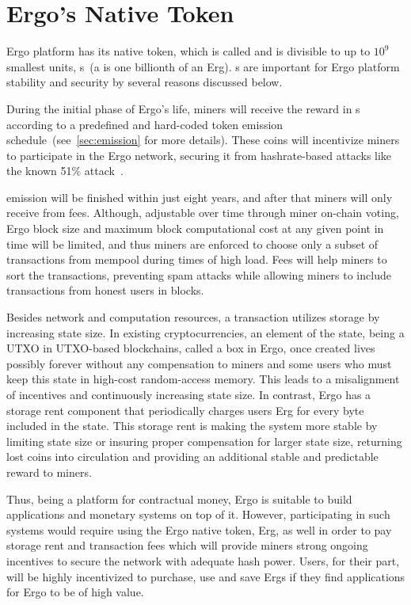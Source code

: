 \section{Ergo's Native Token}
\label{sec:currency}

Ergo platform has its native token, which is
called \Erg{} and is divisible to up to $10^9$ smallest units, \nanoErg{}s~(a \nanoErg{} is one billionth of an Erg).
\Erg{}s are important for Ergo platform stability and security by several reasons discussed below.

During the initial phase of Ergo's life, miners will receive the reward in \Erg{}s
according to a predefined and hard-coded token emission schedule~(see~\ref{sec:emission} for more details).
These coins will incentivize miners to participate in the Ergo network, securing it from hashrate-based attacks
like the known 51\% attack~\cite{reorgAttack}.

\Erg{} emission will be finished within just eight years, and after that miners will only receive \Erg{} from
fees.
Although, adjustable over time through miner on-chain voting, Ergo block size and maximum block computational
cost at any given point in time will be limited,
and thus miners are enforced to
choose only a subset of transactions from mempool during times of high load.
Fees will help miners to sort the transactions, preventing spam attacks while allowing miners
to include transactions from honest users in blocks.

Besides network and computation resources, a transaction utilizes storage by increasing state size.
In existing cryptocurrencies, an element of the state, being  a UTXO  in  UTXO-based  blockchains,  called  a box
in  Ergo, once created lives possibly forever without any compensation to miners and some users who must keep this state
in high-cost random-access memory. This leads to a misalignment of incentives and continuously increasing state size.
In contrast, Ergo has a storage rent component that periodically charges users Erg for every byte
included in the state.
This storage rent is making the system more stable by limiting state size or insuring proper compensation for larger
state size, returning lost coins into
circulation and providing an additional stable and predictable reward to miners.

Thus, being a platform for contractual money, Ergo is suitable to build applications and monetary systems
on top of it.
However, participating in such systems would require using the Ergo native token, Erg, as well in order to pay
storage rent and transaction fees which will provide miners strong ongoing incentives to secure the network with
adequate hash power. Users, for their part, will be highly incentivized to purchase, use and save Ergs if they
find applications for Ergo to be of high value.

